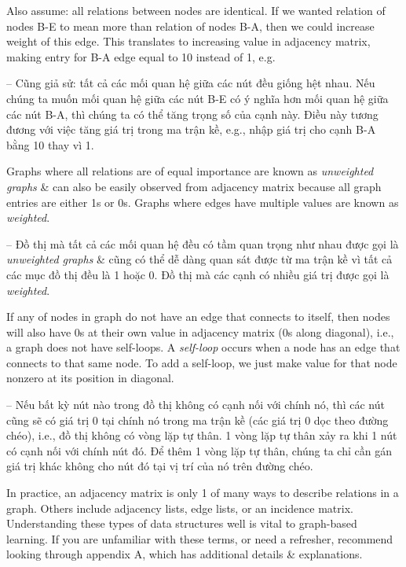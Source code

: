 \documentclass{article}
\begin{document}
\begin{itemize}
\begin{itemize}
\begin{itemize}
            Also assume: all relations between nodes are identical. If we wanted relation of nodes B-E to mean more than relation of nodes B-A, then we could increase weight of this edge. This translates to increasing value in adjacency matrix, making entry for B-A edge equal to 10 instead of 1, e.g.

            -- Cũng giả sử: tất cả các mối quan hệ giữa các nút đều giống hệt nhau. Nếu chúng ta muốn mối quan hệ giữa các nút B-E có ý nghĩa hơn mối quan hệ giữa các nút B-A, thì chúng ta có thể tăng trọng số của cạnh này. Điều này tương đương với việc tăng giá trị trong ma trận kề, e.g., nhập giá trị cho cạnh B-A bằng 10 thay vì 1.

            Graphs where all relations are of equal importance are known as {\it unweighted graphs} \& can also be easily observed from adjacency matrix because all graph entries are either 1s or 0s. Graphs where edges have multiple values are known as {\it weighted}.

            -- Đồ thị mà tất cả các mối quan hệ đều có tầm quan trọng như nhau được gọi là {\it unweighted graphs} \& cũng có thể dễ dàng quan sát được từ ma trận kề vì tất cả các mục đồ thị đều là 1 hoặc 0. Đồ thị mà các cạnh có nhiều giá trị được gọi là {\it weighted}.

            If any of nodes in graph do not have an edge that connects to itself, then nodes will also have 0s at their own value in adjacency matrix (0s along diagonal), i.e., a graph does not have self-loops. A {\it self-loop} occurs when a node has an edge that connects to that same node. To add a self-loop, we just make value for that node nonzero at its position in diagonal.

            -- Nếu bất kỳ nút nào trong đồ thị không có cạnh nối với chính nó, thì các nút cũng sẽ có giá trị 0 tại chính nó trong ma trận kề (các giá trị 0 dọc theo đường chéo), i.e., đồ thị không có vòng lặp tự thân. 1 vòng lặp tự thân {\it} xảy ra khi 1 nút có cạnh nối với chính nút đó. Để thêm 1 vòng lặp tự thân, chúng ta chỉ cần gán giá trị khác không cho nút đó tại vị trí của nó trên đường chéo.

            In practice, an adjacency matrix is only 1 of many ways to describe relations in a graph. Others include adjacency lists, edge lists, or an incidence matrix. Understanding these types of data structures well is vital to graph-based learning. If you are unfamiliar with these terms, or need a refresher, recommend looking through appendix A, which has additional details \& explanations.


\end{itemize}
\end{itemize}
\end{itemize}
\end{document}

